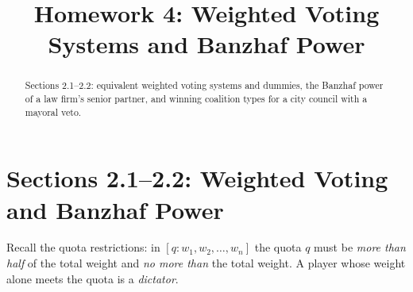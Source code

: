 \documentclass[12pt]{ximera}
\title{Homework 4: Weighted Voting Systems and Banzhaf Power}
\begin{document}
\begin{abstract}
Sections 2.1--2.2: equivalent weighted voting systems and dummies, the Banzhaf power of a
law firm's senior partner, and winning coalition types for a city council with a
mayoral veto.
\end{abstract}
\maketitle

\section*{Sections 2.1--2.2: Weighted Voting and Banzhaf Power}

Recall the quota restrictions: in $[q: w_1, w_2, \ldots, w_n]$ the quota $q$ must be
\emph{more than half} of the total weight and \emph{no more than} the total weight. A
player whose weight alone meets the quota is a \emph{dictator}.
\end{document}
